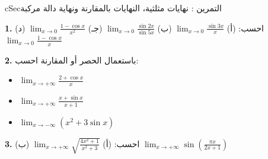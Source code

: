 \documentclass[12pt,a4paper]{article}
\newenvironment{BOX}[2]{\begin{otherlanguage}{english}\begin{arbox}{#1}{#2}}{\end{arbox}\end{otherlanguage}}
\newcounter{exo}
\newenvironment{tamrin}[1]{\stepcounter{exo}\begin{BOX}{cSec}{التمرين \theexo: #1}}{\end{BOX}}
\newenvironment{sq}{\begin{itemize}[leftmargin=2.4em,itemsep=3pt]}{\end{itemize}}
\newcommand{\qa}{\item[(أ)]}\newcommand{\qb}{\item[(ب)]}\newcommand{\qc}{\item[(جـ)]}\newcommand{\qd}{\item[(د)]}\newcommand{\qe}{\item[(هـ)]}
\newcommand{\QQ}[1]{\par\smallskip\textbf{#1.} }
\begin{document}
\begin{tamrin}{نهايات مثلثية، النهايات بالمقارنة ونهاية دالة مركبة}
\QQ{1} احسب: \quad (أ) $\displaystyle\lim_{x\to0}\frac{\sin 3x}{x}$ \qquad (ب) $\displaystyle\lim_{x\to0}\frac{\sin 2x}{\sin 5x}$ \qquad (جـ) $\displaystyle\lim_{x\to0}\frac{1-\cos x}{x^{2}}$ \qquad (د) $\displaystyle\lim_{x\to0}\frac{1-\cos x}{x}$
\QQ{2} باستعمال الحصر أو المقارنة احسب:
\begin{sq}
\qa $\displaystyle\lim_{x\to+\infty}\frac{2+\cos x}{x}$
\qb $\displaystyle\lim_{x\to+\infty}\frac{x+\sin x}{x+1}$
\qc $\displaystyle\lim_{x\to-\infty}\left(x^{2}+3\sin x\right)$
\end{sq}
\QQ{3} احسب: \quad (أ) $\displaystyle\lim_{x\to+\infty}\sqrt{\frac{4x^{2}+1}{x^{2}+3}}$ \qquad (ب) $\displaystyle\lim_{x\to+\infty}\sin\left(\frac{\pi x}{2x+1}\right)$
\end{tamrin}
\end{document}
